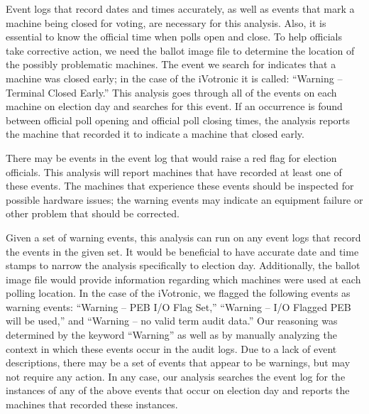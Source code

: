Event logs that record dates and times accurately, as well as events
that mark a machine being closed for voting, are necessary for this
analysis. Also, it is essential to know the official time when polls
open and close. To help officials take corrective action, we need the
ballot image file to determine the location of the possibly
problematic machines. The event we search for indicates that a machine
was closed early; in the case of the iVotronic it is called:
\textquotedblleft Warning -- Terminal Closed
Early.\textquotedblright \hspace{2 mm} This analysis goes through all
of the events on each machine on election day and searches for this
event. If an occurrence is found between official poll opening and
official poll closing times, the analysis reports the machine that
recorded it to indicate a machine that closed early.  

There may be events in the event log that would raise a red flag for election officials. This analysis will report machines that have recorded at least one of these events. The machines that experience these events should be inspected for possible hardware issues; the warning events may indicate an equipment failure or other problem that should be corrected.

Given a set of warning events, this analysis can run on any event logs that record the events in the given set. It would be beneficial to have accurate date and time stamps to narrow the analysis specifically to election day. Additionally, the ballot image file would provide information regarding which machines were used at each polling location.  In the case of the iVotronic, we flagged the following events as warning events: \textquotedblleft Warning -- PEB I/O Flag Set,\textquotedblright \hspace{1 mm} \textquotedblleft Warning -- I/O Flagged PEB will be used,\textquotedblright \hspace{1 mm} and \textquotedblleft Warning -- no valid term audit data.\textquotedblright \hspace{2 mm} Our reasoning was determined by the keyword \textquotedblleft Warning\textquotedblright \hspace{1 mm} as well as by manually analyzing the context in which these events occur in the audit logs. Due to a lack of event descriptions, there may be a set of events that appear to be warnings, but may not require any action. In any case, our analysis searches the event log for the instances of any of the above events that occur on election day and reports the machines that recorded these instances. 

